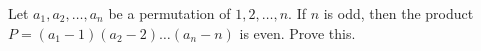 Let $a_1, a_2, \ldots, a_n$ be a permutation of $1, 2, \ldots, n$. If $n$ is odd, then the product $P = (a_1 - 1)(a_2 - 2) \ldots (a_n - n)$ is even. Prove this.

